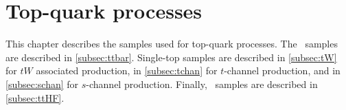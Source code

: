 
\chapter{Top-quark processes}

This chapter describes the samples used for top-quark processes.
The \ttbar\ samples are described in \cref{subsec:ttbar}.
Single-top samples are described in \cref{subsec:tW} for \(tW\) associated production,
in \cref{subsec:tchan} for \(t\)-channel production,
and in \cref{subsec:schan} for \(s\)-channel production.
Finally, \ttHF\ samples are described in \cref{subsec:ttHF}.




